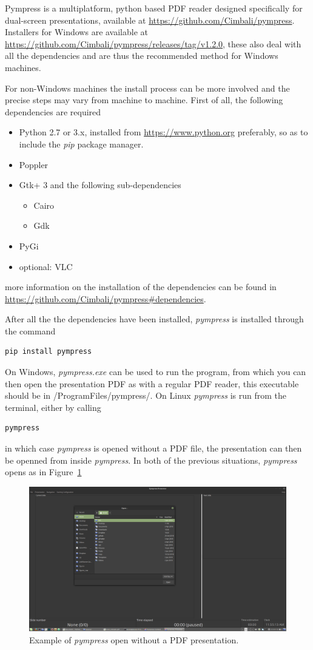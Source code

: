 Pympress is a multiplatform, python based PDF reader designed specifically for dual-screen presentations, available at \url{https://github.com/Cimbali/pympress}. Installers for Windows are available at \url{https://github.com/Cimbali/pympress/releases/tag/v1.2.0}, these also deal with all the dependencies and are thus the recommended method for Windows machines. 
\par
For non-Windows machines the install process can be more involved and the precise steps may vary from machine to machine. First of all, the following dependencies are required
\begin{itemize}
\item Python 2.7 or 3.x, installed from \url{https://www.python.org} preferably, so as to include the \textit{pip} package manager.
\item Poppler
\item Gtk+ 3 and the following sub-dependencies 
\begin{itemize}
\item Cairo 
\item Gdk
\end{itemize}
\item PyGi
\item optional: VLC
\end{itemize}
more information on the installation of the dependencies can be found in \url{https://github.com/Cimbali/pympress#dependencies}.
\par
After all the the dependencies have been installed, \textit{pympress} is installed through the command
\begin{verbatim}
pip install pympress
\end{verbatim}
\par
On Windows, \textit{pympress.exe} can be used to run the program, from which you can then open the presentation PDF as with a regular PDF reader, this executable should be in /ProgramFiles/pympress/. On Linux \textit{pympress} is run from the terminal, either by calling 
\begin{verbatim}
pympress
\end{verbatim}
in which case \textit{pympress} is opened without a PDF file, the presentation can then be openned from inside \textit{pympress}. 
In both of the previous situations, \textit{pympress} opens as in Figure~\ref{fig:pympressColdOpen}
\begin{figure}[h]
\centering
\includegraphics[width=.7\linewidth]{../chapter/beamer/figures/pympressColdOpen.png}
\caption{Example of \textit{pympress} open without a PDF presentation.}
\label{fig:pympressColdOpen}
\end{figure}
